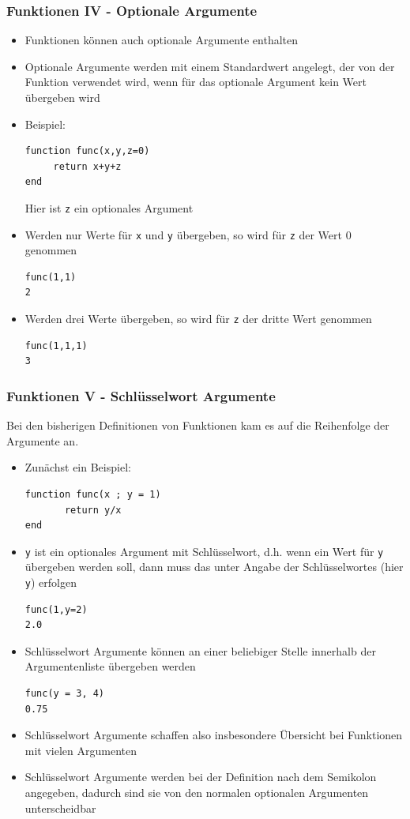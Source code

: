 \begin{frame}[fragile]
\frametitle{Funktionen IV - Optionale Argumente}
\begin{itemize}
\item Funktionen können auch optionale Argumente enthalten
\pause
\item Optionale Argumente werden mit einem Standardwert angelegt, der von der Funktion verwendet wird, wenn für das optionale Argument kein Wert übergeben wird
\pause
\item Beispiel:
\begin{verbatim}
function func(x,y,z=0)
     return x+y+z
end
\end{verbatim}
Hier ist \verb+z+ ein optionales Argument
\pause
\item Werden nur Werte für \verb+x+ und \verb+y+ übergeben, so wird für \verb+z+ der Wert 0 genommen
\begin{verbatim}
func(1,1)
2
\end{verbatim}
\pause
\item Werden drei Werte übergeben, so wird für \verb+z+ der dritte Wert genommen
\begin{verbatim}
func(1,1,1)
3
\end{verbatim}
\end{itemize}
\end{frame}
\begin{frame}[fragile]
\frametitle{Funktionen V - Schlüsselwort Argumente}
Bei den bisherigen Definitionen von Funktionen kam es auf die Reihenfolge der Argumente an.
\begin{itemize}
\pause
\item Zunächst ein Beispiel:
\begin{verbatim}
function func(x ; y = 1)
       return y/x
end
\end{verbatim}
\pause
\item \verb+y+ ist ein optionales Argument mit Schlüsselwort, d.h. wenn ein Wert für \verb+y+ übergeben werden soll, dann muss das unter Angabe der Schlüsselwortes (hier \verb+y+) erfolgen
\begin{verbatim}
func(1,y=2)
2.0
\end{verbatim}
\pause
\item Schlüsselwort Argumente können an einer beliebiger Stelle innerhalb der Argumentenliste übergeben werden
\begin{verbatim}
func(y = 3, 4)
0.75
\end{verbatim}
\item Schlüsselwort Argumente schaffen also insbesondere Übersicht bei Funktionen mit vielen Argumenten\pause
\item Schlüsselwort Argumente werden bei der Definition nach dem Semikolon angegeben, dadurch sind sie von den normalen optionalen Argumenten unterscheidbar
\end{itemize}
\end{frame}
